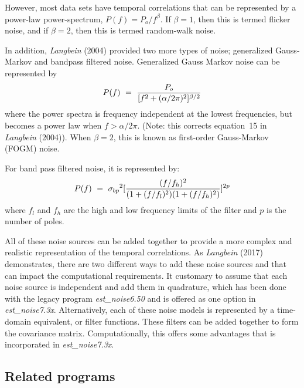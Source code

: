\documentclass[12pt]{amsart}
\begin{document}
However, most data sets have temporal correlations that can be represented by a power-law power-spectrum, $P(f)=P_o/f^{\beta}$. If $\beta =1$, then this is termed flicker noise, and if $\beta =2$, then this is termed random-walk noise.

In addition, \textit{Langbein} (2004) provided two more types of noise; generalized Gauss-Markov and bandpass filtered noise.
Generalized Gauss Markov noise can be represented by
\begin{equation}
P(f)~= ~{{P_o} \over [f^2 + ({\alpha}/{2{\pi}})^2]^{{\beta}/2}}
\end{equation}
where the power spectra is frequency independent at the lowest frequencies, but becomes a power law when $f > {\alpha}/{2{\pi}}$. (Note: this corrects equation~15 in \textit{Langbein} (2004)). When $\beta=2$, this is known as first-order Gauss-Markov (FOGM) noise.

For band pass filtered noise, it is represented by:
\begin{equation}
P(f)~= ~{{\sigma_{bp}}^2  [ {{(f/f_h)^2} \over {(1 + (f/f_l)^2)(1 + (f/f_h)^2)} }] ^{2p}}
\end{equation}
where $f_l$ and $f_h$ are the high and low frequency limits of the filter and $p$ is the number of poles.

All of these noise sources can be added together to provide a more complex and realistic representation of the temporal correlations.  As \textit{Langbein} (2017) demonstrates, there are two different ways to add these noise sources and
that can impact the computational requirements.  It customary to assume that each noise source is independent
and add them in quadrature, which has been done with the legacy program \textit{est\_noise6.50} and is offered
as one option in \textit{est\_noise7.3x}.  Alternatively, each of these noise models is represented by
a time-domain equivalent, or filter functions.  These filters can be added together to form the covariance
matrix. Computationally, this offers some advantages that is incorporated in \textit{est\_noise7.3x}.

\subsection{Related programs}
\end{document}
